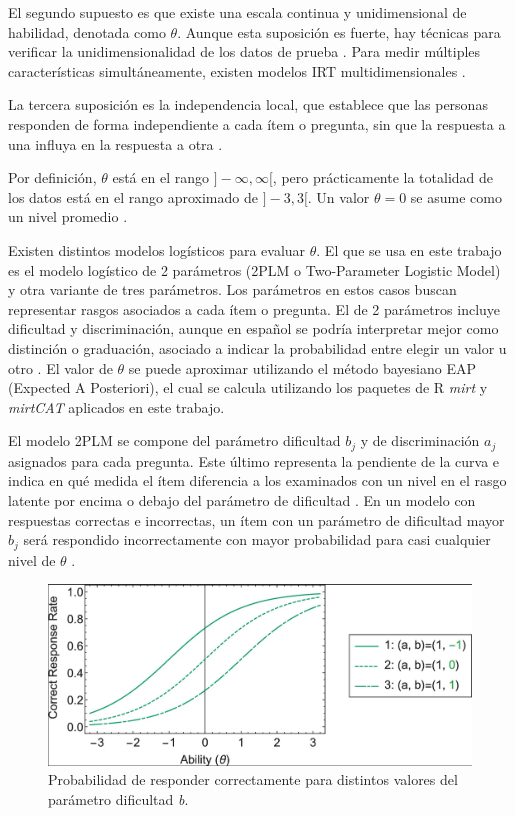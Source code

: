 El segundo supuesto es que existe una escala continua y unidimensional de habilidad, denotada como $\theta$. Aunque esta suposición es fuerte, hay técnicas para verificar la unidimensionalidad de los datos de prueba \cite{IRTShojima2022}. Para medir múltiples características simultáneamente, existen modelos IRT multidimensionales \cite{Reckase2009MultidimensionalIRT}.

La tercera suposición es la independencia local, que establece que las personas responden de forma independiente a cada ítem o pregunta, sin que la respuesta a una influya en la respuesta a otra \cite{CalderonStatisticalIRT}.

Por definición, $\theta$ está en el rango $]-\infty, \infty [$, pero prácticamente la totalidad de los datos está en el rango aproximado de $]-3, 3[$. Un valor $\theta = 0$ se asume como un nivel promedio \cite{IRTShojima2022}. 

Existen distintos modelos logísticos para evaluar $\theta$. El que se usa en este trabajo es el modelo logístico de 2 parámetros (2PLM o Two-Parameter Logistic Model) y otra variante de tres parámetros. Los parámetros en estos casos buscan representar rasgos asociados a cada ítem o pregunta. El de 2 parámetros incluye dificultad y discriminación, aunque en español se podría interpretar mejor como distinción o graduación, asociado a indicar la probabilidad entre elegir un valor u otro \cite{CalderonStatisticalIRT}.  El valor de $\theta$ se puede aproximar utilizando el método bayesiano EAP (Expected A Posteriori), el cual se calcula utilizando los paquetes de R \textit{mirt} \cite{RMIRT} y \textit{mirtCAT} \cite{RPackageMIRTCAT} aplicados en este trabajo. 

El modelo 2PLM se compone del parámetro dificultad $b_j$ y de discriminación $a_j$ asignados para cada pregunta. Este último representa la pendiente de la curva e indica en qué medida el ítem diferencia a los examinados con un nivel en el rasgo latente por encima o debajo del parámetro de dificultad \cite{TeoriaRespuestaAlItemPsicologia}. En un modelo con respuestas correctas e incorrectas, un ítem con un parámetro de dificultad mayor $b_j$ será respondido incorrectamente con mayor probabilidad para casi cualquier nivel de $\theta$ \cite{IRTShojima2022}.


\begin{figure}[h]
	\centering
	\includegraphics[scale=.5]{imagenes/IRTparambdifficulty.png}
	\caption{Probabilidad de responder correctamente para distintos valores del parámetro dificultad \textit{b}.}
	\label{ParamDifficulty}
\end{figure}


